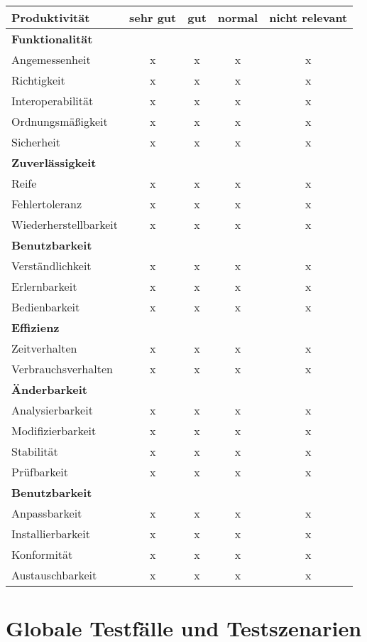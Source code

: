 \documentclass[parskip=full,11pt]{scrartcl}
\begin{document}
\renewcommand{\arraystretch}{1.5}
\begin{table}[H]
  \begin{center}
    \begin{tabularx}{\textwidth}{X c c c c}
      \hline
      
      \textbf{{\large Produktivität}} & \textbf{{\large sehr gut}} & \textbf{{\large gut}} & \textbf{{\large normal} } &\textbf{{\large nicht relevant }}\\
      
      \hline      
      \multicolumn{5}{l}{\textbf{Funktionalität}}\\      
      \hline      
      Angemessenheit & x & x & x & x\\
	  Richtigkeit & x & x & x & x\\
	  Interoperabilität & x & x & x & x\\
	  Ordnungsmäßigkeit & x & x & x & x\\	
      Sicherheit & x & x & x & x\\	
		    
	  \hline	  
      \multicolumn{5}{l}{\textbf{Zuverlässigkeit}}\\     
      \hline
      Reife & x & x & x & x\\
	  Fehlertoleranz & x & x & x & x\\
	  Wiederherstellbarkeit & x & x & x & x\\
		
	  \hline	  	
	  \multicolumn{5}{l}{\textbf{Benutzbarkeit}}\\
      \hline
      Verständlichkeit & x & x & x & x\\
	  Erlernbarkeit & x & x & x & x\\
	  Bedienbarkeit & x & x & x & x\\
	  
	  \hline	  	
	  \multicolumn{5}{l}{\textbf{Effizienz}}\\
      \hline
      Zeitverhalten & x & x & x & x\\
	  Verbrauchsverhalten & x & x & x & x\\	
	  
	  \hline	  	
	  \multicolumn{5}{l}{\textbf{Änderbarkeit}}\\
      \hline
      Analysierbarkeit & x & x & x & x\\
	  Modifizierbarkeit & x & x & x & x\\
	  Stabilität & x & x & x & x\\
	  Prüfbarkeit & x & x & x & x\\
	  
	  \hline	  	
	  \multicolumn{5}{l}{\textbf{Benutzbarkeit}}\\
      \hline
      Anpassbarkeit & x & x & x & x\\
	  Installierbarkeit & x & x & x & x\\
	  Konformität & x & x & x & x\\
	  Austauschbarkeit & x & x & x & x\\
	  
	  \hline      			
    \end{tabularx}
  \end{center}
  
\end{table}
\renewcommand{\arraystretch}{1}
\section{Globale Testfälle und Testszenarien}

\newpage
\printglossary	
\end{document}
